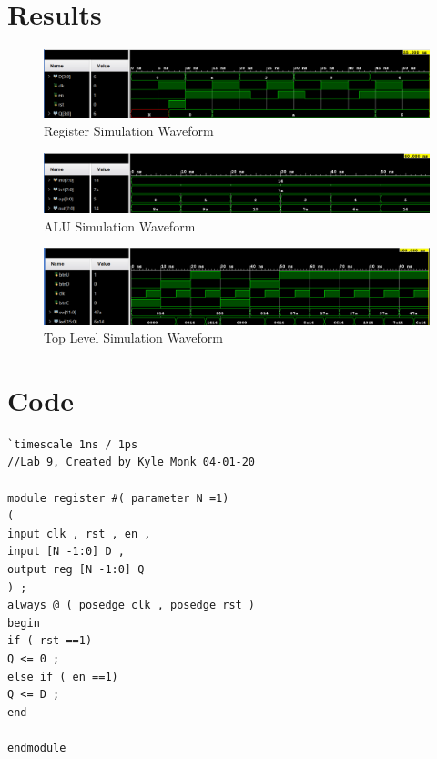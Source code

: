 \documentclass[11pt]{article}
\begin{document}
\section*{Results}

\begin{figure}
	\centering
	\includegraphics[width=1\linewidth]{register_test}
	\caption{Register Simulation Waveform}
	\label{fig:registertest}
\end{figure}

\begin{figure}
	\centering
	\includegraphics[width=1\linewidth]{alu_test_CORRECTED}
	\caption{ALU Simulation Waveform}
	\label{fig:alutest}
\end{figure}



\begin{figure}
	\centering
	\includegraphics[width=1\linewidth]{basys3_lab9}
	\caption{Top Level Simulation Waveform}
	\label{fig:basys3lab9}
\end{figure}

\clearpage

\section*{Code}
\begin{lstlisting}[style=Verilog,
caption=register Design,
label=code:ex1]
`timescale 1ns / 1ps
//Lab 9, Created by Kyle Monk 04-01-20

module register #( parameter N =1)
(
input clk , rst , en ,
input [N -1:0] D ,
output reg [N -1:0] Q
) ;
always @ ( posedge clk , posedge rst )
begin
if ( rst ==1)
Q <= 0 ;
else if ( en ==1)
Q <= D ;
end

endmodule

\end{lstlisting}
\end{document}
